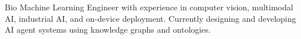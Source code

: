 \begin{rSection}{Bio}
  Machine Learning Engineer with experience in computer vision, multimodal AI, industrial AI, and on-device deployment.
  Currently designing and developing AI agent systems using knowledge graphs and ontologies.
\end{rSection}
